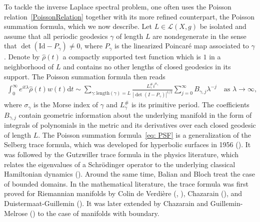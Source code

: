 \documentclass[11pt,letterpaper,oneside]{amsart}
\newcommand{\Id}{\text{Id}}
\theoremstyle{definition}
\theoremstyle{remark}
\newcommand{\wh}{\widehat}
\theoremstyle{definition}
\theoremstyle{remark}
\newcommand{\CL}{\mathcal{L}}
\newcommand{\dif}{\mathrm{d}}
\begin{document}
To tackle the inverse Laplace spectral problem, one often uses the Poisson relation~\eqref{PoissonRelation} together with its more refined counterpart, the Poisson summation formula, which we now describe. Let $L \in \CL(X,g)$ be isolated and assume that all periodic geodesics $\gamma$ of length $L$ are nondegenerate in the sense that $\det(\Id - P_\gamma) \neq 0$, where $P_\gamma$ is the linearized Poincar\'e map associated to $\gamma$. Denote by $\wh \rho(t)$ a compactly supported test function which is $1$ in a neighborhood of $L$ and contains no other lengths of closed geodesics in its support. The Poisson summation formula then reads
\begin{align}\label{eq: PSF}
	\int_0^\infty e^{i t \lambda} \wh \rho(t) w(t) \dif t \sim \sum_{\gamma: \text{length}(\gamma) = L} 
	\frac{L_\gamma^\# i^{\sigma_\gamma} }{|\det(I-P_\gamma)|^{1/2}} \sum_{j = 0}^\infty B_{\gamma, j} \lambda^{-j} \quad \text{as}\,\, \lambda \to \infty,
\end{align}
where $\sigma_\gamma$ is the Morse index of $\gamma$ and $L_\gamma^\#$ is its primitive period. The coefficients $B_{\gamma,j}$ contain geometric information about the underlying manifold in the form of integrals of polynomials in the metric and its derivatives over each closed geodesic of length $L$. The Poisson summation formula~\eqref{eq: PSF} is a generalization of the Selberg trace formula, which was developed for hyperbolic surfaces in 1956 (\cite{Sel56}). It was followed by the Gutzwiller trace formula in the physics literature, which relates the eigenvalues of a Schr\"odinger operator to the underlying classical Hamiltonian dynamics (\cite{Gutzwiller}). Around the same time, Balian and Bloch \cite{BB1, BB2, BB3} treat the case of bounded domains. In the mathematical literature, the trace formula was first proved for Riemannian manifolds by Colin de Verdi\`ere (\cite{CdVsllgp1}, \cite{CdVsllgp2}), Chazarain (\cite{Chazarain1974}), and Duistermaat-Guillemin (\cite{DuGu75}). It was later extended by Chazarain \cite{Ch76} and Guillemin-Melrose (\cite{GuMe79a}) to the case of manifolds with boundary.

\medskip
\end{document}
